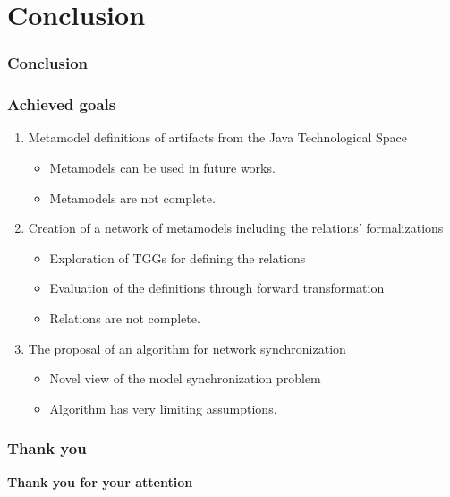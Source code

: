 \documentclass{beamer}
\begin{document}
\section{Conclusion} %
\begin{frame}
	\frametitle{Conclusion}
\end{frame}

\begin{frame}[t]
	\frametitle{Achieved goals}
	\begin{enumerate}
		\item Metamodel definitions of artifacts from the Java Technological Space
		\begin{itemize}
			\item Metamodels can be used in future works.
			\item Metamodels are not complete.
		\end{itemize}
		\pause
		\item Creation of a network of metamodels including the relations' formalizations
		\begin{itemize}
			\item Exploration of TGGs for defining the relations
			\item Evaluation of the definitions through forward transformation
			\item Relations are not complete.
		\end{itemize}
		\pause
		\item The proposal of an algorithm for network synchronization
		\begin{itemize}
			\item Novel view of the model synchronization problem
			\item Algorithm has very limiting assumptions.
		\end{itemize}
	\end{enumerate}
\end{frame}

\begin{frame}
	\frametitle{Thank you}
	\begin{center}
		{\LARGE \textbf{Thank you for your attention}}
	\end{center}
\end{frame}
\end{document}
